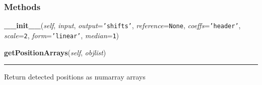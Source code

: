 
  \subsubsection{Methods}

    \label{multireg:imageshift:ImageShift:__init__}
    \vspace{0.5ex}

    \begin{boxedminipage}{\textwidth}

    \raggedright \textbf{\_\_init\_\_}(\textit{self}, \textit{input}, \textit{output}=\texttt{'\-s\-h\-i\-f\-t\-s\-'\-}, \textit{reference}=\texttt{N\-o\-n\-e\-}, \textit{coeffs}=\texttt{'\-h\-e\-a\-d\-e\-r\-'\-}, \textit{scale}=\texttt{2\-}, \textit{form}=\texttt{'\-l\-i\-n\-e\-a\-r\-'\-}, \textit{median}=\texttt{1\-})

    \end{boxedminipage}

    \label{multireg:imageshift:ImageShift:getPositionArrays}
    \vspace{0.5ex}

    \begin{boxedminipage}{\textwidth}

    \raggedright \textbf{getPositionArrays}(\textit{self}, \textit{objlist})

    \vspace{-1.5ex}

    \rule{\textwidth}{0.5\fboxrule}
    Return detected positions as numarray arrays

    \vspace{1ex}

    \end{boxedminipage}

    \label{multireg:imageshift:ImageShift:run}
    \vspace{0.5ex}

